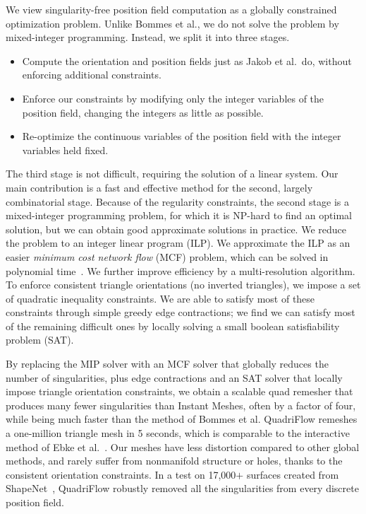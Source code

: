 We view singularity-free position field computation as a globally constrained optimization problem.
Unlike Bommes et al., we do not solve the problem by mixed-integer programming. Instead, we split it into three stages.
\begin{itemize}
\item Compute the orientation and position fields just as Jakob et al.\ do, without enforcing additional constraints.
\item Enforce our constraints by modifying only the integer variables of the position field, changing the integers as little as possible.
\item Re-optimize the continuous variables of the position field with the integer variables held fixed.
\end{itemize}
The third stage is not difficult, requiring the solution of a linear system. Our main contribution is a fast and effective method for the second, largely combinatorial stage. Because of the regularity constraints, the second stage is a mixed-integer programming problem, for which it is NP-hard to find an optimal solution, but we can obtain good approximate solutions in practice. We reduce the problem to an integer linear program (ILP). We approximate the ILP as an easier \emph{minimum cost network flow} (MCF) problem, which can be solved in polynomial time~\cite{klein1967primal}. We further improve efficiency by a multi-resolution algorithm. To enforce consistent triangle orientations (no inverted triangles), we impose a set of quadratic inequality constraints. We are able to satisfy most of these constraints through simple greedy edge contractions; we find we can satisfy most of the remaining difficult ones by locally solving a small boolean satisfiability problem (SAT).

By replacing the MIP solver with an MCF solver that globally reduces the number of singularities, plus edge contractions and an SAT solver that locally impose triangle orientation constraints, we obtain a scalable quad remesher that produces many fewer singularities than Instant Meshes, often by a factor of four, while being much faster than the method of Bommes et al. QuadriFlow remeshes a one-million triangle mesh in 5 seconds, which is comparable to the interactive method of Ebke et al.~\cite{ebke2016interactively}. Our meshes have less distortion compared to other global methods, and rarely suffer from nonmanifold structure or holes, thanks to the consistent orientation constraints. In a test on 17,000$+$ surfaces created from ShapeNet~\cite{chang2015shapenet}, QuadriFlow robustly removed all the singularities from every discrete position field.

